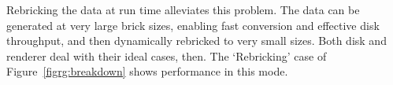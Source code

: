 Rebricking the data at run time alleviates this problem.  The data can
be generated at very large brick sizes, enabling fast conversion and
effective disk throughput, and then dynamically rebricked to very small
sizes.  Both disk and renderer deal with their ideal cases, then.  The
`Rebricking' case of Figure~\ref{figrg:breakdown} shows performance in
this mode.


% 
% 
%


